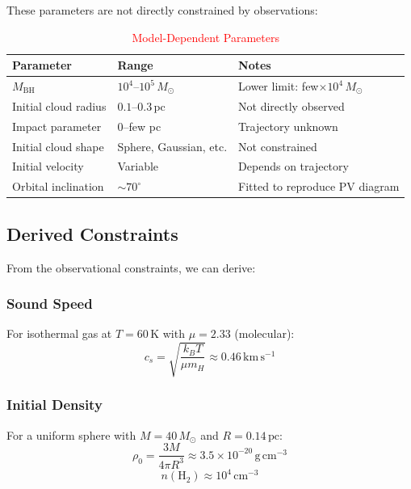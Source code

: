 \documentclass[11pt,a4paper]{article}
\newcommand{\Msun}{M_\odot}
\newcommand{\kms}{\,\mathrm{km\,s^{-1}}}
\newcommand{\pc}{\,\mathrm{pc}}
\newcommand{\cmcubed}{\,\mathrm{cm^{-3}}}
\begin{document}
These parameters are not directly constrained by observations:

\begin{table}[h]
\centering
\caption{\textcolor{red}{Model-Dependent Parameters}}
\begin{tabular}{lll}
\toprule
\textbf{Parameter} & \textbf{Range} & \textbf{Notes} \\
\midrule
$M_\mathrm{BH}$ & $10^4$--$10^5\,\Msun$ & Lower limit: few$\times 10^4\,\Msun$ \\
Initial cloud radius & $0.1$--$0.3\pc$ & Not directly observed \\
Impact parameter & 0--few pc & Trajectory unknown \\
Initial cloud shape & Sphere, Gaussian, etc. & Not constrained \\
Initial velocity & Variable & Depends on trajectory \\
Orbital inclination & $\sim 70^\circ$ & Fitted to reproduce PV diagram \\
\bottomrule
\end{tabular}
\end{table}

\subsection{Derived Constraints}

From the observational constraints, we can derive:

\subsubsection{Sound Speed}
For isothermal gas at $T = 60\,\mathrm{K}$ with $\mu = 2.33$ (molecular):
\begin{equation}
    c_s = \sqrt{\frac{k_B T}{\mu m_H}} \approx 0.46\kms
\end{equation}

\subsubsection{Initial Density}
For a uniform sphere with $M = 40\,\Msun$ and $R = 0.14\pc$:
\begin{equation}
    \rho_0 = \frac{3M}{4\pi R^3} \approx 3.5 \times 10^{-20}\,\mathrm{g\,cm^{-3}}
\end{equation}
\begin{equation}
    n(\mathrm{H}_2) \approx 10^4\cmcubed
\end{equation}
\end{document}
